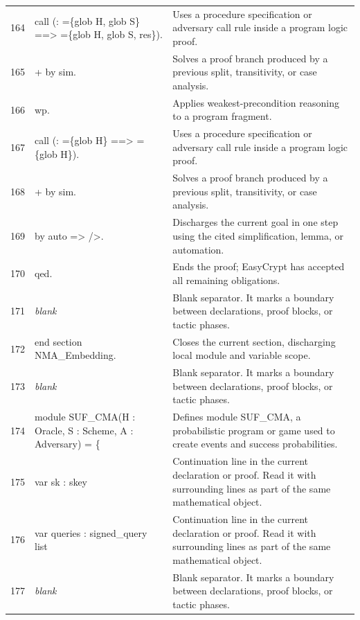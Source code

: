 \documentclass[10pt]{article}
\begin{document}
\begin{longtable}{r L{0.53\textwidth} L{0.37\textwidth}}
164 & {\ttfamily\scriptsize call (: =\{glob H, glob S\} ==> =\{glob H, glob S, res\}).} & Uses a procedure specification or adversary call rule inside a program logic proof. \\
165 & {\ttfamily\scriptsize + by sim.} & Solves a proof branch produced by a previous split, transitivity, or case analysis. \\
166 & {\ttfamily\scriptsize wp.} & Applies weakest-precondition reasoning to a program fragment. \\
167 & {\ttfamily\scriptsize call (: =\{glob H\} ==> =\{glob H\}).} & Uses a procedure specification or adversary call rule inside a program logic proof. \\
168 & {\ttfamily\scriptsize + by sim.} & Solves a proof branch produced by a previous split, transitivity, or case analysis. \\
169 & {\ttfamily\scriptsize by auto => />.} & Discharges the current goal in one step using the cited simplification, lemma, or automation. \\
170 & {\ttfamily\scriptsize qed.} & Ends the proof; EasyCrypt has accepted all remaining obligations. \\
171 & {\ttfamily\scriptsize \emph{blank}} & Blank separator.  It marks a boundary between declarations, proof blocks, or tactic phases. \\
172 & {\ttfamily\scriptsize end section NMA\_Embedding.} & Closes the current section, discharging local module and variable scope. \\
173 & {\ttfamily\scriptsize \emph{blank}} & Blank separator.  It marks a boundary between declarations, proof blocks, or tactic phases. \\
174 & {\ttfamily\scriptsize module SUF\_CMA(H : Oracle, S : Scheme, A : Adversary) = \{} & Defines module SUF\_CMA, a probabilistic program or game used to create events and success probabilities. \\
175 & {\ttfamily\scriptsize   var sk : skey} & Continuation line in the current declaration or proof.  Read it with surrounding lines as part of the same mathematical object. \\
176 & {\ttfamily\scriptsize   var queries : signed\_query list} & Continuation line in the current declaration or proof.  Read it with surrounding lines as part of the same mathematical object. \\
177 & {\ttfamily\scriptsize \emph{blank}} & Blank separator.  It marks a boundary between declarations, proof blocks, or tactic phases. \\

\end{longtable}
\end{document}
